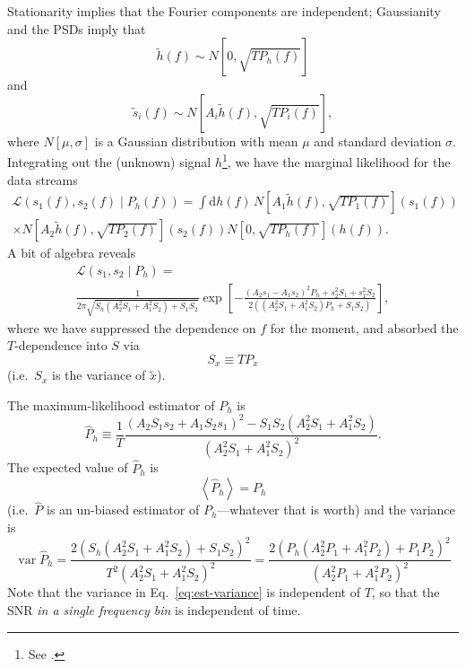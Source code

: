 \documentclass[modern]{aastex63}
\DeclareMathOperator{\var}{var}
\newcommand{\dd}{\mathrm{d}}
\begin{document}
Stationarity implies that the Fourier components are independent; Gaussianity
and the \acp{PSD} imply that
%
\begin{equation}
  \tilde{h}(f) \sim N\left[0, \sqrt{T P_h(f)} \right]
\end{equation}
%
and
%
\begin{equation}
  \tilde{s}_i(f) \sim N\left[ A_i \tilde{h}(f), \sqrt{T P_i(f)} \right],
\end{equation}
%
where $N[\mu, \sigma]$ is a Gaussian distribution with mean $\mu$ and standard
deviation $\sigma$.  Integrating out the (unknown) signal $h$\footnote{See
\citet{Cornish2013}.}, we have the marginal likelihood for the data streams
%
\begin{multline}
  \mathcal{L} \left( s_1(f), s_2(f) \mid P_h(f) \right) = \int \dd h(f) \, N\left[ A_1 \tilde{h}(f), \sqrt{T P_1(f)} \right]\left( s_1(f) \right) \\ \times N\left[ A_2 \tilde{h}(f), \sqrt{T P_2(f)} \right]\left( s_2(f) \right) N\left[0, \sqrt{T P_h(f)} \right]\left( h(f) \right).
\end{multline}
A bit of algebra reveals
%
\begin{multline}
  \mathcal{L} \left( s_1, s_2 \mid P_h \right) = \\ \frac{1}{2\pi \sqrt{S_h \left( A_2^2 S_1 + A_1^2 S_2 \right) + S_1 S_2}} \exp\left[ - \frac{\left(A_2 s_1 - A_1 s_2\right)^2 P_h + s_2^2 S_1 + s_1^2 S_2}{2 \left(\left(A_2^2 S_1 + A_1^2 S_2 \right)P_h + S_1 S_2 \right)}\right],
\end{multline}
%
where we have suppressed the dependence on $f$ for the moment, and absorbed the
$T$-dependence into $S$ via
%
\begin{equation}
  S_x \equiv T P_x
\end{equation}
%
(i.e.\ $S_x$ is the variance of $\tilde{x}$).

The maximum-likelihood estimator of $P_h$ is
%
\begin{equation}
  \label{eq:ml-est}
 \hat{P}_h \equiv \frac{1}{T} \frac{\left( A_2 S_1 s_2 + A_1 S_2 s_1 \right)^2 - S_1 S_2 \left( A_2^2 S_1 + A_1^2 S_2 \right)}{\left( A_2^2 S_1 + A_1^2 S_2 \right)^2}.
\end{equation}
%
The expected value of $\hat{P}_h$ is
%
\begin{equation}
  \left\langle \hat{P}_h \right\rangle = P_h
\end{equation}
%
(i.e.\ $\hat{P}$ is an un-biased estimator of $P_h$---whatever that is worth)
and the variance is
%
\begin{equation}
  \label{eq:est-variance}
  \var \hat{P}_h = \frac{2 \left( S_h \left(A_2^2 S_1 + A_1^2 S_2 \right) + S_1 S_2 \right)^2}{T^2 \left( A_2^2 S_1 + A_1^2 S_2 \right)^2} = \frac{2 \left( P_h \left(A_2^2 P_1 + A_1^2 P_2 \right) + P_1 P_2 \right)^2}{\left( A_2^2 P_1 + A_1^2 P_2 \right)^2}
\end{equation}
%
Note that the variance in Eq.\ \eqref{eq:est-variance} is independent of $T$, so
that the \ac{SNR} \emph{in a single frequency bin} is independent of time.
\end{document}
